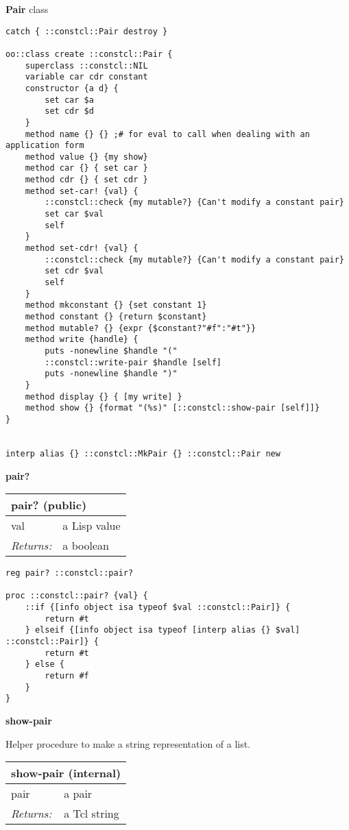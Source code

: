 \documentclass{report}
\begin{document}
\textbf{Pair} class

\noindent\makebox[\linewidth]{\rule{\linewidth}{0.4pt}}
\begin{lstlisting}
catch { ::constcl::Pair destroy }
 
oo::class create ::constcl::Pair {
    superclass ::constcl::NIL
    variable car cdr constant
    constructor {a d} {
        set car $a
        set cdr $d
    }
    method name {} {} ;# for eval to call when dealing with an application form
    method value {} {my show}
    method car {} { set car }
    method cdr {} { set cdr }
    method set-car! {val} {
        ::constcl::check {my mutable?} {Can't modify a constant pair}
        set car $val
        self
    }
    method set-cdr! {val} {
        ::constcl::check {my mutable?} {Can't modify a constant pair}
        set cdr $val
        self
    }
    method mkconstant {} {set constant 1}
    method constant {} {return $constant}
    method mutable? {} {expr {$constant?"#f":"#t"}}
    method write {handle} {
        puts -nonewline $handle "("
        ::constcl::write-pair $handle [self]
        puts -nonewline $handle ")"
    }
    method display {} { [my write] }
    method show {} {format "(%s)" [::constcl::show-pair [self]]}
}
 
 
interp alias {} ::constcl::MkPair {} ::constcl::Pair new
\end{lstlisting}
\noindent\makebox[\linewidth]{\rule{\linewidth}{0.4pt}}

\textbf{pair?}

\begin{tabular}{ |l l| }
\hline
\multicolumn{2}{|l|}{pair? (public)} \\
\hline
val & a Lisp value \\
\textit{Returns:} & a boolean \\
\hline
\end{tabular}

\noindent\makebox[\linewidth]{\rule{\linewidth}{0.4pt}}
\begin{lstlisting}
reg pair? ::constcl::pair?
 
proc ::constcl::pair? {val} {
    ::if {[info object isa typeof $val ::constcl::Pair]} {
        return #t
    } elseif {[info object isa typeof [interp alias {} $val] ::constcl::Pair]} {
        return #t
    } else {
        return #f
    }
}
\end{lstlisting}
\noindent\makebox[\linewidth]{\rule{\linewidth}{0.4pt}}

\textbf{show-pair}


Helper procedure to make a string representation of a list.

\begin{tabular}{ |l l| }
\hline
\multicolumn{2}{|l|}{show-pair (internal)} \\
\hline
pair & a pair \\
\textit{Returns:} & a Tcl string \\
\hline
\end{tabular}
\end{document}
